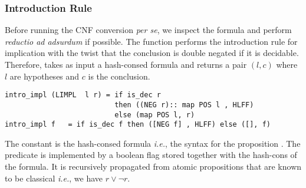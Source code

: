 \documentclass[utf8,a4paper,UKenglish,cleveref, autoref, thm-restate]{lipics-v2019}
\begin{document}
\subsubsection{Introduction Rule}
Before running the CNF conversion \emph{per se}, we inspect the
formula and perform \emph{reductio ad adsurdum} if possible. The
function  performs the introduction rule for
implication with the twist that the conclusion is double negated if it
is decidable. Therefore, 
takes as input a hash-consed formula and returns a pair
$(l,c)$ where $l$ are hypotheses and $c$ is the conclusion.
\begin{verbatim}
intro_impl (LIMPL  l r) = if is_dec r
                          then ((NEG r):: map POS l , HLFF)
                          else (map POS l, r)
intro_impl f   = if is_dec f then ([NEG f] , HLFF) else ([], f)
\end{verbatim}
The constant  is the hash-consed formula 
\emph{i.e.}, the syntax for the proposition .  The
 predicate is implemented by a boolean flag
stored together with the hash-cons of the formula. It is recursively
propagated from atomic propositions that are known to be classical
\emph{i.e.}, we have $r \lor \neg r$.
\end{document}
